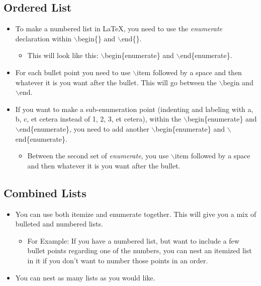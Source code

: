 	\subsection{Ordered List}
		\begin{itemize}
			\item To make a numbered list in \LaTeX{}, you need to use the \textit{enumerate} declaration within $\backslash$begin\{\} and $\backslash$end\{\}.
			\begin{itemize}
				\item This will look like this: $\backslash$begin\{enumerate\} and $\backslash$end\{enumerate\}.
			\end{itemize}
			\item For each bullet point you need to use $\backslash$item followed by a space and then whatever it is you want after the bullet. This will go between the $\backslash$begin and $\backslash$end.
			\item If you want to make a sub-enumeration point (indenting and labeling with a, b, c, et cetera instead of 1, 2, 3, et cetera), within the $\backslash$begin\{enumerate\} and $\backslash$end\{enumerate\}, you need to add another $\backslash$begin\{enumerate\} and $\backslash$end\{enumerate\}.
			\begin{itemize}
				\item Between the second set of \textit{enumerate}, you  use $\backslash$item followed by a space and then whatever it is you want after the bullet.
			\end{itemize}
		\end{itemize}

	\subsection{Combined Lists}
		\begin{itemize}
			\item You can use both itemize and enumerate together. This will give you a mix of bulleted and numbered lists.
			\begin{itemize}
				\item For Example: If you have a numbered list, but want to include a few bullet points regarding one of the numbers, you can nest an itemized list in it if you don\rq{}t want to number those points in an order.
			\end{itemize}
			\item You can nest as many lists as you would like.
		\end{itemize}

